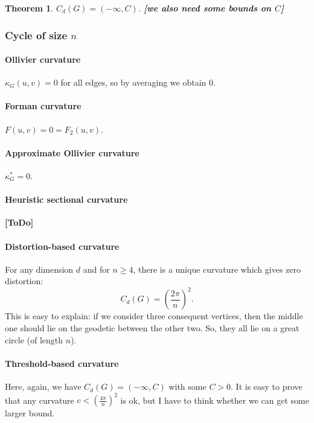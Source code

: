 \documentclass{article} %
\newtheorem{theorem}{Theorem}[section]
\begin{document}
\begin{theorem}\label{thm:tree_threshold}
$C_d(G) = (-\infty, C)$.
\textbf{[we also need some bounds on $C$]}
\end{theorem}



\subsubsection{Cycle of size $n$} 

\paragraph{Ollivier curvature}  
$\kappa_G(u,v) = 0$ for all edges, so by averaging we obtain $0$.

\paragraph{Forman curvature} 

$F(u,v) = 0 = F_2(u,v)$.

\paragraph{Approximate Ollivier curvature} 

$\kappa_G^* = 0$.

\paragraph{Heuristic sectional curvature} \textbf{[ToDo]}

\paragraph{Distortion-based curvature} For any dimension $d$ and for $n \ge 4$, there is a unique curvature which gives zero distortion:
\[
C_d(G) = \left(\frac{2\pi}{n}\right)^2.
\]
This is easy to explain: if we consider three consequent vertices, then the middle one should lie on the geodetic between the other two. So, they all lie on a great circle (of length $n$).

\paragraph{Threshold-based curvature} 
Here, again, we have $C_d(G) = (-\infty, C)$ with some $C>0$. It is easy to prove that any curvature $c < \left(\frac{4\pi}{n}\right)^2$ is ok, but I have to think whether we can get some larger bound. 
\end{document}
